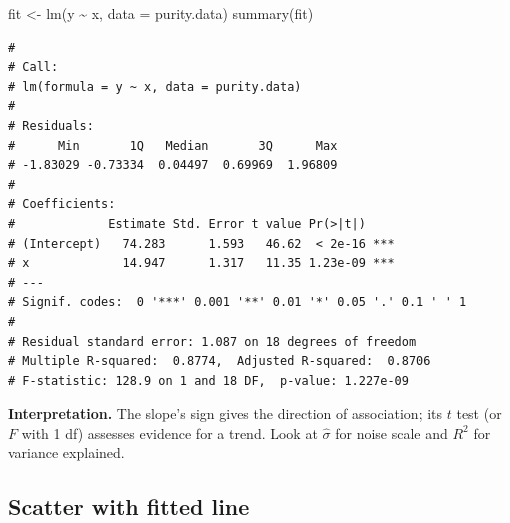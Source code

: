 \documentclass[
  letterpaper,
  DIV=11,
  numbers=noendperiod]{scrreprt}
\newenvironment{Shaded}{\begin{snugshade}}{\end{snugshade}}
\newcommand{\AttributeTok}[1]{\textcolor[rgb]{0.40,0.45,0.13}{#1}}
\newcommand{\DecValTok}[1]{\textcolor[rgb]{0.68,0.00,0.00}{#1}}
\newcommand{\FunctionTok}[1]{\textcolor[rgb]{0.28,0.35,0.67}{#1}}
\newcommand{\NormalTok}[1]{\textcolor[rgb]{0.00,0.23,0.31}{#1}}
\newcommand{\OtherTok}[1]{\textcolor[rgb]{0.00,0.23,0.31}{#1}}
\newcommand{\SpecialCharTok}[1]{\textcolor[rgb]{0.37,0.37,0.37}{#1}}
\newcommand{\StringTok}[1]{\textcolor[rgb]{0.13,0.47,0.30}{#1}}
\begin{document}
\begin{Shaded}
\begin{Highlighting}[]
\NormalTok{fit }\OtherTok{\textless{}{-}} \FunctionTok{lm}\NormalTok{(y }\SpecialCharTok{\textasciitilde{}}\NormalTok{ x, }\AttributeTok{data =}\NormalTok{ purity.data)}
\FunctionTok{summary}\NormalTok{(fit)}
\end{Highlighting}
\end{Shaded}

\begin{verbatim}
# 
# Call:
# lm(formula = y ~ x, data = purity.data)
# 
# Residuals:
#      Min       1Q   Median       3Q      Max 
# -1.83029 -0.73334  0.04497  0.69969  1.96809 
# 
# Coefficients:
#             Estimate Std. Error t value Pr(>|t|)    
# (Intercept)   74.283      1.593   46.62  < 2e-16 ***
# x             14.947      1.317   11.35 1.23e-09 ***
# ---
# Signif. codes:  0 '***' 0.001 '**' 0.01 '*' 0.05 '.' 0.1 ' ' 1
# 
# Residual standard error: 1.087 on 18 degrees of freedom
# Multiple R-squared:  0.8774,  Adjusted R-squared:  0.8706 
# F-statistic: 128.9 on 1 and 18 DF,  p-value: 1.227e-09
\end{verbatim}

\textbf{Interpretation.} The slope's sign gives the direction of
association; its \(t\) test (or \(F\) with 1 df) assesses evidence for a
trend. Look at \(\hat\sigma\) for noise scale and \(R^2\) for variance
explained.

\subsection{Scatter with fitted line}\label{scatter-with-fitted-line}

\begin{Shaded}
\end{Shaded}
\end{document}
